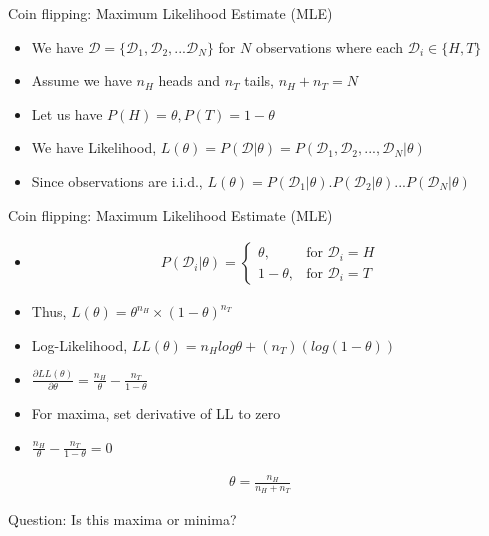 \documentclass[aspectratio=1610]{beamer}
\newcommand{\data}{\mathcal{D}}
\begin{document}
\begin{frame}{Coin flipping: Maximum Likelihood Estimate (MLE)}
\begin{itemize}
	\item We have $\mathcal{D} = \{\data_1, \data_2, ...\data_{N}\}$ for $N$ observations where each $\mathcal{D}_i \in \{H, T\}$
	\item Assume we have $n_H$ heads and $n_T$ tails, $n_H + n_T = N$
	\item Let us have $P(H) = \theta, P(T) = 1-\theta$
	\item We have Likelihood, $L(\theta) = P(\mathcal{D}|\theta) = P(\data_1, \data_2, ..., \data_N|\theta)$
	\item Since observations are i.i.d., $L(\theta) = P(\data_1|\theta).P(\data_2|\theta) ... P(\data_N|\theta)$
\end{itemize}

\end{frame}


\begin{frame}{Coin flipping: Maximum Likelihood Estimate (MLE)}
\begin{itemize}
	\item  
\begin{align*}  
P(\data_i|\theta) =  \left
\{\begin{array}{lr} \theta, & \text{for~} \data_i =H \\
1-\theta, & \text{for~} \data_i = T
\end{array}\right.\
\end{align*}  
\item Thus, $L(\theta) = \theta^{n_H}\times (1-\theta)^{n_T}$
\item Log-Likelihood, $LL(\theta) = n_Hlog\theta + (n_T)(log(1-\theta))$
\item $\frac{\partial LL(\theta)}{\partial \theta} = \frac{n_H}{\theta} - \frac{n_T}{1-\theta}$
\item  For maxima, set derivative of LL to zero

\item 	$\frac{n_H}{\theta} - \frac{n_T}{1-\theta} = 0 $
\end{itemize}
\begin{tcolorbox}
	\begin{align*}
	 \theta = \frac{n_H}{n_H + n_T}
	\end{align*}

\end{tcolorbox}
Question: Is this maxima or minima?

\end{frame}
\end{document}
